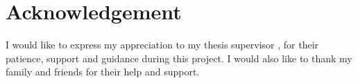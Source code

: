 \thispagestyle{empty}
\section*{Acknowledgement}

I would like to express my appreciation to my thesis supervisor \mySupervisor, for their patience, support and guidance during this project. I would also like to thank my family and friends for their help and support.

\newpage
\thispagestyle{empty}
\mbox{}
\newpage